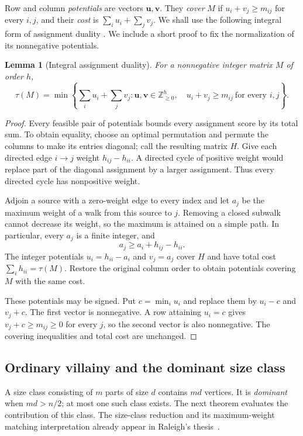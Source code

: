 \documentclass[11pt,reqno]{amsart}
\numberwithin{equation}{section}
\newtheorem{lemma}[theorem]{Lemma}
\theoremstyle{definition}
\theoremstyle{remark}
\begin{document}
Row and column \emph{potentials} are vectors $\mathbf u,\mathbf v$.
They \emph{cover} $M$ if $u_i+v_j\ge m_{ij}$ for every $i,j$, and their
\emph{cost} is $\sum_i u_i+\sum_jv_j$.
We shall use the following integral form of assignment duality
\cite{kuhn1955}. We include a short proof to fix the normalization
of its nonnegative potentials.

\begin{lemma}[Integral assignment duality]\label{lem:assignment-duality}
For a nonnegative integer matrix $M$ of order $h$,
\[
 \tau(M)=\min\left\{
 \sum_i u_i+\sum_j v_j:
 \mathbf u,\mathbf v\in\mathbb Z_{\ge0}^h,
 \quad u_i+v_j\ge m_{ij}\ \text{for every }i,j
 \right\}.
\]
\end{lemma}
\begin{proof}
Every feasible pair of potentials bounds every assignment score by its
total sum. To obtain equality, choose an optimal permutation and permute
the columns to make its entries diagonal; call the resulting matrix $H$.
Give each directed edge $i\to j$ weight $h_{ij}-h_{ii}$. A directed cycle
of positive weight would replace part of the diagonal assignment by a
larger assignment. Thus every directed cycle has nonpositive weight.

Adjoin a source with a zero-weight edge to every index and let $a_j$ be
the maximum weight of a walk from this source to $j$. Removing a closed
subwalk cannot decrease its weight, so the maximum is attained on a
simple path. In particular, every $a_j$ is a finite integer, and
\[
 a_j\ge a_i+h_{ij}-h_{ii}.
\]
The integer potentials $u_i=h_{ii}-a_i$ and $v_j=a_j$ cover $H$ and have
total cost $\sum_i h_{ii}=\tau(M)$. Restore the original column order to
obtain potentials covering $M$ with the same cost.

These potentials may be signed. Put $c=\min_i u_i$ and replace them by
$u_i-c$ and $v_j+c$. The first vector is nonnegative. A row attaining
$u_i=c$ gives $v_j+c\ge m_{ij}\ge0$ for every $j$, so the second vector
is also nonnegative. The covering inequalities and total cost are unchanged.
\end{proof}

\subsection{Ordinary villainy and the dominant size class}

A size class consisting of $m$ parts of size $d$ contains $md$ vertices.
It is \emph{dominant} when $md>n/2$; at most one such class exists. The next
theorem evaluates the contribution of this class. The size-class
reduction and its maximum-weight matching interpretation already
appear in Raleigh's thesis~\cite[Chapter~II]{raleigh2018}.
\end{document}
